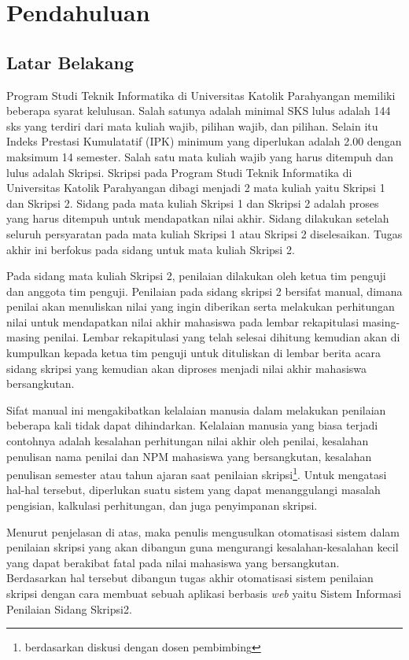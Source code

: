\chapter{Pendahuluan}
\label{chap:pendahuluan}

\section{Latar Belakang}
\label{sec:latarBelakang}

	Program Studi Teknik Informatika di Universitas Katolik Parahyangan memiliki beberapa syarat kelulusan. Salah satunya adalah minimal SKS lulus adalah 144 sks yang terdiri dari mata kuliah wajib, pilihan wajib, dan pilihan. Selain itu Indeks Prestasi Kumulatatif (IPK) minimum  yang diperlukan adalah 2.00 dengan maksimum 14 semester. Salah satu mata kuliah wajib yang harus ditempuh dan lulus adalah Skripsi. Skripsi pada Program Studi Teknik Informatika di Universitas Katolik Parahyangan dibagi menjadi 2 mata kuliah yaitu Skripsi 1 dan Skripsi 2. Sidang pada mata kuliah Skripsi 1 dan Skripsi 2 adalah proses yang harus ditempuh untuk mendapatkan nilai akhir. Sidang dilakukan setelah seluruh persyaratan pada mata kuliah Skripsi 1 atau Skripsi 2 diselesaikan. Tugas akhir ini berfokus pada sidang untuk mata kuliah Skripsi 2.
	
	Pada sidang mata kuliah Skripsi 2, penilaian dilakukan oleh ketua tim penguji dan anggota tim penguji. Penilaian pada sidang skripsi 2 bersifat manual, dimana penilai akan menuliskan nilai yang ingin diberikan serta melakukan perhitungan nilai untuk mendapatkan nilai akhir mahasiswa pada lembar rekapitulasi masing-masing penilai. Lembar rekapitulasi yang telah selesai dihitung kemudian akan di kumpulkan kepada ketua tim penguji untuk dituliskan di lembar berita acara sidang skripsi yang kemudian akan diproses menjadi nilai akhir mahasiswa bersangkutan.
	
	Sifat manual ini mengakibatkan kelalaian manusia dalam melakukan penilaian beberapa kali tidak dapat dihindarkan. Kelalaian manusia yang biasa terjadi contohnya adalah kesalahan perhitungan nilai akhir oleh penilai, kesalahan penulisan nama penilai dan NPM mahasiswa yang bersangkutan, kesalahan penulisan semester atau tahun ajaran saat penilaian skripsi\footnote{berdasarkan diskusi dengan dosen pembimbing}. Untuk mengatasi hal-hal tersebut, diperlukan suatu sistem yang dapat menanggulangi masalah pengisian, kalkulasi perhitungan, dan juga penyimpanan skripsi.
	
	Menurut penjelasan di atas, maka penulis mengusulkan otomatisasi sistem dalam penilaian skripsi yang akan dibangun guna mengurangi kesalahan-kesalahan kecil yang dapat berakibat fatal pada nilai mahasiswa yang bersangkutan. Berdasarkan hal tersebut dibangun tugas akhir otomatisasi sistem penilaian skripsi dengan cara membuat sebuah aplikasi berbasis \textit{web} yaitu Sistem Informasi Penilaian Sidang Skripsi2.
		
